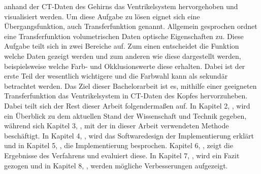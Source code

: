 anhand der CT-Daten des Gehirns das Ventrikelsystem hervorgehoben und visualisiert werden. Um diese Aufgabe zu lösen eignet sich eine Übergangsfunktion, auch Transferfunktion genannt.
\newline
Allgemein gesprochen ordnet eine Transferfunktion volumetrischen Daten optische Eigenschaften zu. Diese Aufgabe teilt sich in zwei Bereiche auf. Zum einen entscheidet die Funktion welche Daten gezeigt werden und zum anderen wie diese dargestellt werden, beispielsweise welche Farb- und Okklusionswerte diese erhalten. Dabei ist der erste Teil der wesentlich wichtigere und die Farbwahl kann als sekundär betrachtet werden.
\newline
Das Ziel dieser Bachelorarbeit ist es, mithilfe einer geeigneten Transferfunktion das Ventrikelsystem in CT-Daten des Kopfes hervorzuheben.
\newline
Dabei teilt sich der Rest dieser Arbeit folgendermaßen auf. In Kapitel 2, , wird ein Überblick zu dem aktuellen Stand der Wissenschaft und Technik gegeben, während sich Kapitel 3, , mit der in dieser Arbeit verwendeten Methode beschäftigt. In Kapitel 4, , wird das Softwaredesign der Implementierung erklärt und in Kapitel 5, , die Implementierung besprochen. Kapitel 6, , zeigt die Ergebnisse des Verfahrens und evaluiert diese. In Kapitel 7, , wird ein Fazit gezogen und in Kapitel 8, , werden mögliche Verbesserungen aufgezeigt.